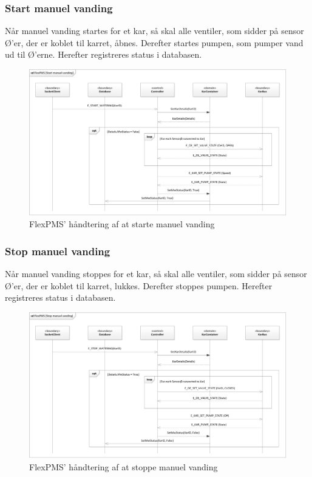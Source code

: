 
\subsubsection{Start manuel vanding}

Når manuel vanding startes for et kar, så skal alle ventiler, som sidder på sensor Ø'er, der er koblet til karret, åbnes. Derefter startes pumpen, som pumper vand ud til Ø'erne. Herefter registreres status i databasen.

\begin{figure}[H]
	\centering
	\includegraphics[scale=.6]{SoftwareArkitektur/FlexPMS/Diagrammer/Case_StartManuelVanding.png}
	\caption{FlexPMS' håndtering af at starte manuel vanding}
	\label{photo:OpenOValveUseCase}
\end{figure}


\subsubsection{Stop manuel vanding}

Når manuel vanding stoppes for et kar, så skal alle ventiler, som sidder på sensor Ø'er, der er koblet til karret, lukkes. Derefter stoppes pumpen. Herefter registreres status i databasen.

\begin{figure}[H]
	\centering
	\includegraphics[scale=.6]{SoftwareArkitektur/FlexPMS/Diagrammer/Case_StopManuelVanding.png}
	\caption{FlexPMS' håndtering af at stoppe manuel vanding}
	\label{photo:OpenOValveUseCase}
\end{figure}



